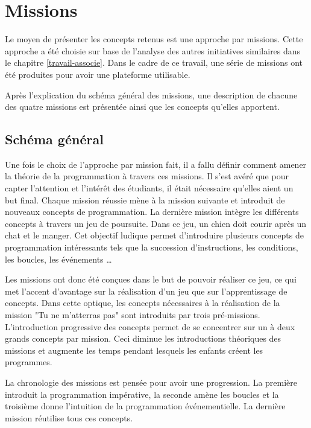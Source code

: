 \section{Missions}
\label{missions}
Le moyen de présenter les concepts retenus est une approche par \glspl{mission}. Cette approche a été choisie sur base de l'analyse des autres initiatives similaires dans le chapitre \ref{travail-associe}. Dans le cadre de ce travail, une série de \glspl{mission} ont été produites pour avoir une plateforme utilisable.

Après l'explication du schéma général des \glspl{mission}, une description de chacune des quatre \glspl{mission} est présentée ainsi que les concepts qu'elles apportent.

\subsection{Schéma général}
Une fois le choix de l'approche par mission fait, il a fallu définir comment amener la théorie de la programmation à travers ces \glspl{mission}. Il s'est avéré que pour capter l'attention et l'intérêt des étudiants, il était nécessaire qu'elles aient un but final. Chaque \gls{mission} réussie mène à la mission suivante et introduit de nouveaux concepts de programmation. La dernière mission intègre les différents concepts à travers un jeu de poursuite. Dans ce jeu, un chien doit courir après un chat et le manger. Cet objectif ludique permet d'introduire plusieurs concepts de programmation intéressants tels que la succession d'instructions, les conditions, les boucles, les événements \ldots

Les \glspl{mission} ont donc été conçues dans le but de pouvoir réaliser ce jeu, ce qui met l'accent d'avantage sur la réalisation d'un jeu que sur l'apprentissage de concepts. Dans cette optique, les concepts nécessaires à la réalisation de la \gls{mission} "Tu ne m'atterras pas" sont introduits par trois pré-missions. L'introduction progressive des concepts permet de se concentrer sur un à deux grands concepts par \gls{mission}. Ceci diminue les introductions théoriques des \glspl{mission} et augmente les temps pendant lesquels les enfants créent les programmes.

La chronologie des \glspl{mission} est pensée pour avoir une progression. La première introduit la programmation impérative, la seconde amène les boucles et la troisième donne l'intuition de la programmation événementielle. La dernière \gls{mission} réutilise tous ces concepts.

